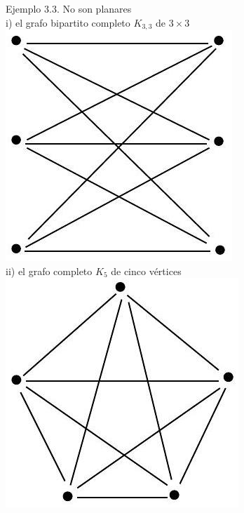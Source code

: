 \documentclass[10pt]{article}
\begin{document}
Ejemplo 3.3. No son planares\\
i) el grafo bipartito completo $K_{3,3}$ de $3 \times 3$\\
\includegraphics[max width=\textwidth, center]{2025_09_05_93c7c1835f249f70c0eeg-06(3)}\\
ii) el grafo completo $K_{5}$ de cinco vértices\\
\includegraphics[max width=\textwidth, center]{2025_09_05_93c7c1835f249f70c0eeg-06(2)}
\end{document}
